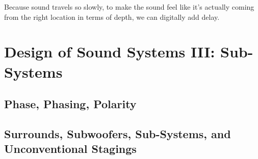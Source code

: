 \documentclass[a4paper]{article}
\begin{document}
Because sound travels so slowly, to make the sound feel like it's actually
coming from the right location in terms of depth, we can digitally add delay.

\section{Design of Sound Systems III: Sub-Systems}
\subsection{Phase, Phasing, Polarity}
\subsection{Surrounds, Subwoofers, Sub-Systems, and Unconventional Stagings}
\end{document}
